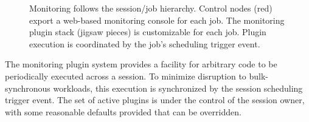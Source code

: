 \begin{figure}
\begin{minipage}[b]{0.4\linewidth}
\end{minipage}
\hspace{1cm}
\begin{minipage}[b]{0.4\linewidth}
\end{minipage}
\caption{Monitoring follows the session/job hierarchy.
Control nodes (red) export a web-based monitoring console for each job.
The monitoring plugin stack (jigsaw pieces) is customizable for each job.
Plugin execution is coordinated by the job's scheduling trigger event.}
\label{FigMonEx1}
\end{figure}


The monitoring plugin system provides a facility for arbitrary code to be
periodically executed across a session.  To minimize disruption to
bulk-synchronous workloads, this execution is synchronized by the 
session scheduling trigger event.  The set of active plugins is
under the control of the session owner, with some reasonable
defaults provided that can be overridden.


